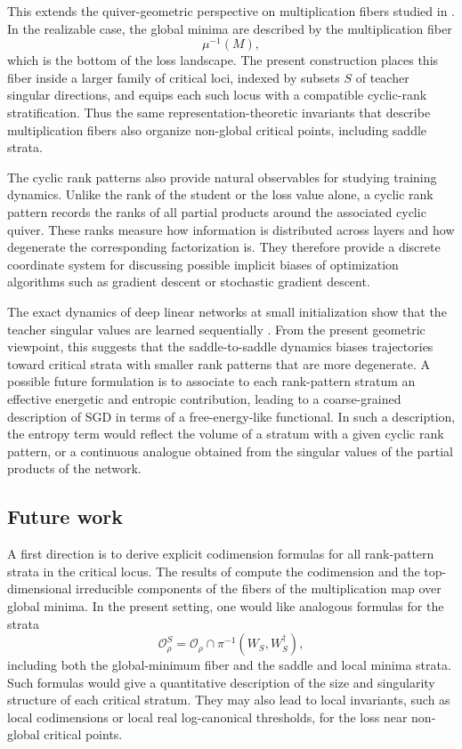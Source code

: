\documentclass[11pt]{article}
\theoremstyle{definition}
\begin{document}
This extends the quiver-geometric perspective on multiplication fibers studied
in \cite{lehalleur2024geometry}. In the realizable case, the global minima are described by the
multiplication fiber
\[
\mu^{-1}(M),
\]
which is the bottom of the loss landscape. The present construction places this
fiber inside a larger family of critical loci, indexed by subsets \(S\) of
teacher singular directions, and equips each such locus with a compatible
cyclic-rank stratification. Thus the same representation-theoretic invariants
that describe multiplication fibers also organize non-global critical points,
including saddle strata.

The cyclic rank patterns also provide natural observables for studying training
dynamics. Unlike the rank of the student or the loss value alone, a cyclic rank pattern records the ranks
of all partial products around the associated cyclic quiver. These ranks measure
how information is distributed across layers and how degenerate the
corresponding factorization is. They therefore provide a discrete coordinate
system for discussing possible implicit biases of optimization algorithms such
as gradient descent or stochastic gradient descent.

The exact dynamics of deep linear networks at small initialization
show that the teacher singular values are learned sequentially \cite{saxe2019mathematical}. From the
present geometric viewpoint, this suggests that the saddle-to-saddle dynamics biases trajectories toward critical strata with smaller rank patterns that are more degenerate. A possible future formulation is to associate to each
rank-pattern stratum an effective energetic and entropic contribution, leading
to a coarse-grained description of SGD in terms of a free-energy-like
functional. In such a description, the entropy term would reflect the volume
of a stratum with a given cyclic rank pattern, or
a continuous analogue obtained from the singular values of the partial products
of the network.

\subsection{Future work}

A first direction is to derive explicit codimension formulas for all
rank-pattern strata in the critical locus. The results of \cite{lehalleur2024geometry} compute
the codimension and the top-dimensional irreducible components of
the fibers of the multiplication map over global minima. In the present setting, one would like analogous formulas
for the strata
\[
\mathcal O_\rho^S
=
\mathcal O_\rho\cap \pi^{-1}(W_S,W_S^{\dagger}),
\]
including both the global-minimum fiber and the saddle and local minima strata. Such
formulas would give a quantitative description of the size and singularity
structure of each critical stratum. They may also lead to local invariants, such
as local codimensions or local real log-canonical thresholds, for the loss near
non-global critical points.
\end{document}
